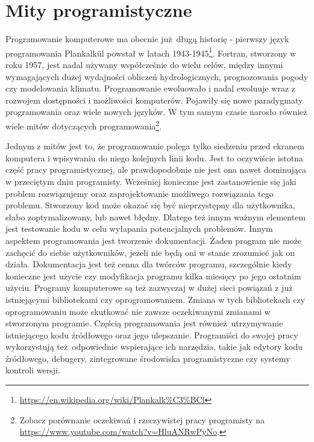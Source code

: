 \documentclass[paper=6in:9in,pagesize=pdftex,headinclude=on,footinclude=on,10pt]{scrbook}
\begin{document}
\hypertarget{mity-programistyczne}{%
\section{Mity programistyczne}\label{mity-programistyczne}}

Programowanie komputerowe ma obecnie już~długą historię - pierwszy język programowania Plankalkül powstał w latach 1943-1945\footnote{\url{https://en.wikipedia.org/wiki/Plankalk\%C3\%BCl}}.
Fortran, stworzony w roku 1957, jest nadal używany współcześnie do wielu celów, między innymi wymagających dużej wydajności obliczeń hydrologicznych, prognozowania pogody czy modelowania klimatu.
Programowanie ewoluowało i nadal ewoluuje wraz z rozwojem dostępności i możliwości komputerów.
Pojawiły się nowe paradygmaty programowania oraz wiele nowych języków.
W tym samym czasie narosło również wiele mitów dotyczących programowania\footnote{Zobacz porównanie oczekiwań i rzeczywistej pracy programisty na \url{https://www.youtube.com/watch?v=HluANRwPyNo}.}.

Jednym z mitów jest to, że programowanie polega tylko siedzeniu przed ekranem komputera i wpisywaniu do niego kolejnych linii kodu.
Jest to oczywiście istotna część pracy programistycznej, ale prawdopodobnie nie jest ona nawet dominująca w przeciętym dniu programisty.
Wcześniej konieczne jest zastanowienie się jaki problem rozwiązujemy oraz zaprojektowanie możliwego rozwiązania tego problemu.
Stworzony kod może okazać się być nieprzystępny dla użytkownika, słabo zoptymalizowany, lub nawet błędny.
Dlatego też innym ważnym elementem jest testowanie kodu w celu wyłapania potencjalnych problemów.
Innym aspektem programowania jest tworzenie dokumentacji.
Żaden program nie może zachęcić do siebie użytkowników, jeżeli nie będą oni w stanie zrozumieć jak on działa.
Dokumentacja jest też cenna dla twórców programu, szczególnie kiedy konieczne jest użycie czy modyfikacja programu kilka miesięcy po jego ostatnim użyciu.
Programy komputerowe są też zazwyczaj w dużej sieci powiązań z już istniejącymi bibliotekami czy oprogramowaniem.
Zmiana w tych bibliotekach czy oprogramowaniu może skutkować nie zawsze oczekiwanymi zmianami w stworzonym programie.
Częścią programowania jest również~utrzymywanie istniejącego kodu źródłowego oraz jego ulepszanie.
Programiści do swojej pracy wykorzystują też~odpowiednie wspierające ich narzędzia, takie jak edytory kodu źródłowego, debugery, zintegrowane środowiska programistyczne czy systemy kontroli wersji.
\end{document}
